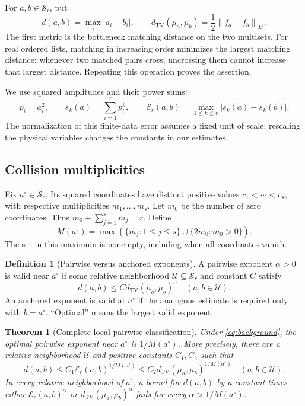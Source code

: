 \documentclass[11pt,a4paper]{article}
\numberwithin{equation}{section}
\newtheorem{theorem}{Theorem}[section]
\theoremstyle{definition}
\newtheorem{definition}[definition]{Definition}
\theoremstyle{remark}
\newcommand{\TV}{d_{\mathrm{TV}}}
\newcommand{\norm}[1]{\left\lVert#1\right\rVert}
\newcommand{\sr}{\mathcal S_r}
\newcommand{\err}{\mathcal E_r}
\newcommand{\base}{a^{\circ}}
\begin{document}
For $a,b\in\sr$, put
\begin{equation}
 d(a,b)=\max_i|a_i-b_i|,
 \qquad \TV(\mu_a,\mu_b)=\frac12\norm{f_a-f_b}_{L^1}.
 \label{eq:metrics}
\end{equation}
The first metric is the bottleneck matching distance on the two multisets.  For
real ordered lists, matching in increasing order minimizes the largest matching
distance: whenever two matched pairs cross, uncrossing them cannot increase that
largest distance.  Repeating this operation proves the assertion.

We use squared amplitudes and their power sums:
\begin{equation}
 p_i=a_i^2,\qquad s_k(a)=\sum_{i=1}^r p_i^k,\qquad
 \err(a,b)=\max_{1\le k\le r}|s_k(a)-s_k(b)|.
 \label{eq:power-metric}
\end{equation}
The normalization of this finite-data error assumes a fixed unit of scale;
rescaling the physical variables changes the constants in our estimates.

\subsection{Collision multiplicities}
Fix $\base\in\sr$.  Its squared coordinates have distinct positive values
$c_1<\cdots<c_s$, with respective multiplicities $m_1,\ldots,m_s$.
Let $m_0$ be the number of zero coordinates.  Thus
$m_0+\sum_{j=1}^s m_j=r$.  Define
\begin{equation}
 M(\base)=\max\left(\{m_j:1\le j\le s\}\cup
                  \{2m_0:m_0>0\}\right).
 \label{eq:M}
\end{equation}
The set in this maximum is nonempty, including when all coordinates vanish.

\begin{definition}[Pairwise versus anchored exponents]
A pairwise exponent $\alpha>0$ is valid near $\base$ if some relative neighborhood
$\mathcal U\subseteq\sr$ and constant $C$ satisfy
\[
 d(a,b)\le C\TV(\mu_a,\mu_b)^\alpha\quad(a,b\in\mathcal U).
\]
An anchored exponent is valid at $\base$ if the analogous estimate is required
only with $b=\base$.  ``Optimal'' means the largest valid exponent.
\end{definition}

\begin{theorem}[Complete local pairwise classification]
\label{thm:pairwise}
Under \eqref{eq:background}, the optimal pairwise exponent near $\base$ is
$1/M(\base)$.  More precisely, there are a relative neighborhood $\mathcal U$ and
positive constants $C_1,C_2$ such that
\begin{equation}
 d(a,b)\le C_1\err(a,b)^{1/M(\base)}
         \le C_2\TV(\mu_a,\mu_b)^{1/M(\base)}
 \quad(a,b\in\mathcal U).
 \label{eq:main-bound}
\end{equation}
In every relative neighborhood of $\base$, a bound for $d(a,b)$ by a constant
times either $\err(a,b)^\alpha$ or $\TV(\mu_a,\mu_b)^\alpha$ fails for every
$\alpha>1/M(\base)$.
\end{theorem}
\end{document}
